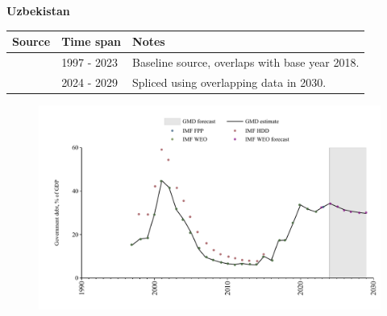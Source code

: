 \documentclass[12pt,a4paper,landscape]{article}
\begin{document}
\begin{adjustbox}{max totalsize={\paperwidth}{\paperheight},center}
\begin{minipage}[t][\textheight][t]{\textwidth}
\vspace*{0.5cm}
{}
\begin{center}
{\Large\bfseries Uzbekistan}
\end{center}
\vspace{0.5cm}
\begin{table}[H]
\centering
\small
\begin{tabular}{|l|l|l|}
\hline
\textbf{Source} & \textbf{Time span} & \textbf{Notes} \\
\hline
\rowcolor{white}\cite{IMF_FPP}& 1997 - 2023 &Baseline source, overlaps with base year 2018.\\
\rowcolor{lightgray}\cite{IMF_WEO_forecast}& 2024 - 2029 &Spliced using overlapping data in 2030.\\
\hline
\end{tabular}
\end{table}
\begin{figure}[H]
\centering
\includegraphics[width=\textwidth,height=0.6\textheight,keepaspectratio]{graphs/UZB_govdebt_GDP.pdf}
\end{figure}
\end{minipage}
\end{adjustbox}
\end{document}
